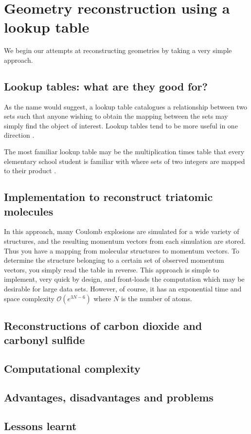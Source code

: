 \chapter{Geometry reconstruction using a lookup table}\label{ch:lookupTable}

We begin our attempts at reconstructing geometries by taking a very simple approach.

\section{Lookup tables: what are they good for?}
As the name would suggest, a lookup table catalogues a relationship between two sets such that anyone wishing to obtain the mapping between the sets may simply find the object of interest. Lookup tables tend to be more useful in one direction \citep{Maher01}.

The most familiar lookup table may be the multiplication times table that every elementary school student is familiar with where sets of two integers are mapped to their product \citep{Hayashi97}. 

\section{Implementation to reconstruct triatomic molecules}
In this approach, many Coulomb explosions are simulated for a wide variety of structures, and the resulting momentum vectors from each simulation are stored. Thus you have a mapping from molecular structures to momentum vectors. To determine the structure belonging to a certain set of observed momentum vectors, you simply read the table in reverse. This approach is simple to implement, very quick by design, and front-loads the computation which may be desirable for large data sets. However, of course, it has an exponential time and space complexity $\mathcal{O}(e^{3N-6})$ where $N$ is the number of atoms.

\section{Reconstructions of carbon dioxide and carbonyl sulfide}

\section{Computational complexity}

\section{Advantages, disadvantages and problems}

\section{Lessons learnt}